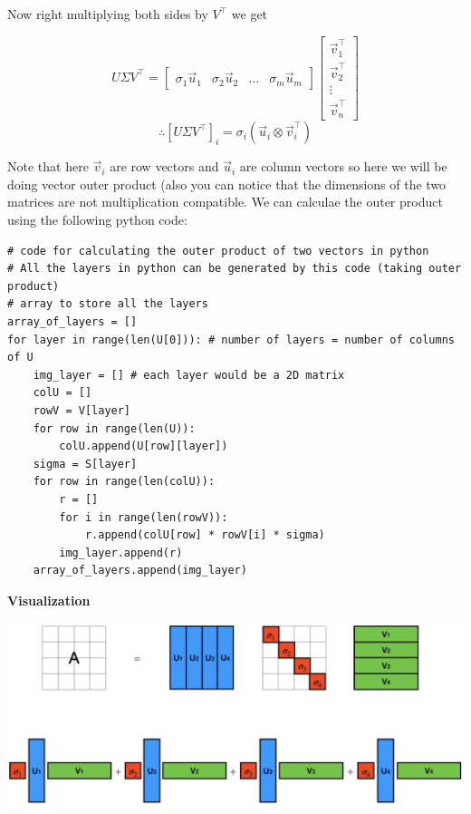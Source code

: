\documentclass{article}
\begin{document}
Now right multiplying both sides by $V^{\top}$ we get

$$
U\Sigma V^{\top} = \begin{bmatrix} \sigma_{1} \vec{u}_{1} & \sigma_{2} \vec{u}_{2} & \dots & \sigma_{m} \vec{u}_{m} \end{bmatrix}
\begin{bmatrix}
    \vec{v}_{1}^{\top} \\
    \vec{v}_{2}^{\top} \\
    \vdots \\
    \vec{v}_{n}^{\top}
\end{bmatrix}
$$
$$
\therefore [U\Sigma V^{\top}]_{i} = \sigma_{i} (\vec{u}_{i} \otimes \vec{v}^{\top}_{i})
$$

Note that here $\vec{v}_{i}$ are row vectors and $\vec{u}_{i}$ are column vectors so here we will be doing vector outer product (also you can notice that the dimensions of the two matrices are not multiplication compatible. We can calculae the outer product using the following python code:

\begin{verbatim}
# code for calculating the outer product of two vectors in python
# All the layers in python can be generated by this code (taking outer product)
# array to store all the layers
array_of_layers = []
for layer in range(len(U[0])): # number of layers = number of columns of U
    img_layer = [] # each layer would be a 2D matrix
    colU = []
    rowV = V[layer]
    for row in range(len(U)):
        colU.append(U[row][layer])
    sigma = S[layer]
    for row in range(len(colU)):
        r = []
        for i in range(len(rowV)):
            r.append(colU[row] * rowV[i] * sigma)
        img_layer.append(r)
    array_of_layers.append(img_layer)

\end{verbatim}

\begin{center}
    \textbf{\large Visualization}
\end{center}

\vspace{0.5cm}

\includegraphics[width=16.5cm]{SVD_visualization.png}
\end{document}
